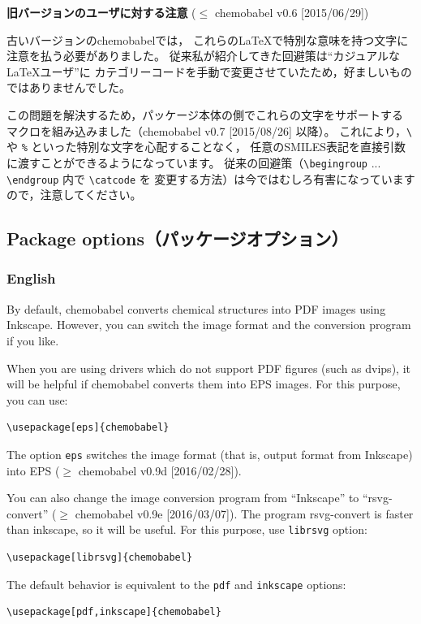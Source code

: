 \documentclass[dvipdfmx,12pt]{jsarticle}
\begin{document}
\noindent \textbf{旧バージョンのユーザに対する注意} ($\le$ \textsf{chemobabel} v0.6 [2015/06/29])

古いバージョンの\textsf{chemobabel}では，
これらの\LaTeX で特別な意味を持つ文字に注意を払う必要がありました。
従来私が紹介してきた回避策は“カジュアルな \LaTeX ユーザ”に
カテゴリーコードを手動で変更させていたため，好ましいものではありませんでした。

この問題を解決するため，パッケージ本体の側でこれらの文字をサポートする
マクロを組み込みました（\textsf{chemobabel} v0.7 [2015/08/26] 以降）。
これにより，\verb|\| や \verb|%| といった特別な文字を心配することなく，
任意のSMILES表記を直接引数に渡すことができるようになっています。
従来の回避策（\verb|\begingroup| ... \verb|\endgroup| 内で \verb|\catcode| を
変更する方法）は今ではむしろ有害になっていますので，注意してください。

\clearpage

\subsection{Package options（パッケージオプション）}

\subsubsection{English}

By default, \textsf{chemobabel} converts chemical structures into
PDF images using Inkscape. However, you can switch the image format
and the conversion program if you like.

When you are using drivers which do not support PDF figures (such as dvips),
it will be helpful if \textsf{chemobabel} converts them into EPS images.
For this purpose, you can use:
\begin{verbatim}
\usepackage[eps]{chemobabel}
\end{verbatim}
The option \verb|eps| switches the image format (that is, output format
from Inkscape) into EPS ($\ge$ \textsf{chemobabel} v0.9d [2016/02/28]).

You can also change the image conversion program from ``Inkscape'' to
``rsvg-convert'' ($\ge$ \textsf{chemobabel} v0.9e [2016/03/07]).
The program rsvg-convert is faster than inkscape, so it will be useful.
For this purpose, use \verb|librsvg| option:
\begin{verbatim}
\usepackage[librsvg]{chemobabel}
\end{verbatim}

The default behavior is equivalent to the \verb|pdf| and \verb|inkscape| options:
\begin{verbatim}
\usepackage[pdf,inkscape]{chemobabel}
\end{verbatim}
\end{document}
